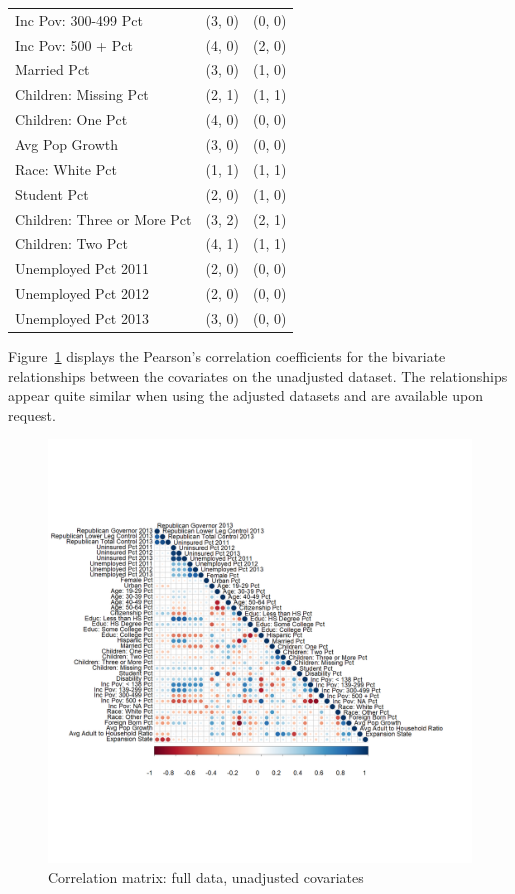 \begin{table}[h!]
\begin{tabular}{lll}
  Inc Pov: 300-499 Pct & (3, 0) & (0, 0) \\ 
  Inc Pov: 500 + Pct & (4, 0) & (2, 0) \\ 
  Married Pct & (3, 0) & (1, 0) \\ 
  Children: Missing Pct & (2, 1) & (1, 1) \\ 
  Children: One Pct & (4, 0) & (0, 0) \\ 
  Avg Pop Growth & (3, 0) & (0, 0) \\ 
  Race: White Pct & (1, 1) & (1, 1) \\ 
  Student Pct & (2, 0) & (1, 0) \\ 
  Children: Three or More Pct & (3, 2) & (2, 1) \\ 
  Children: Two Pct & (4, 1) & (1, 1) \\ 
  Unemployed Pct 2011 & (2, 0) & (0, 0) \\ 
  Unemployed Pct 2012 & (2, 0) & (0, 0) \\ 
  Unemployed Pct 2013 & (3, 0) & (0, 0) \\ 
   \hline
\end{tabular}
\end{table}

Figure~\ref{fig:corrmatrix} displays the Pearson's correlation coefficients for the bivariate relationships between the covariates on the unadjusted dataset. The relationships appear quite similar when using the adjusted datasets and are available upon request.

\begin{figure}[h!]
\begin{center}
    \caption{Correlation matrix: full data, unadjusted covariates}
    \label{fig:corrmatrix}
    \includegraphics[scale=0.25]{01_Plots/correlation-plot-c1-sigma-zero.png}
\end{center}
\end{figure}

\clearpage